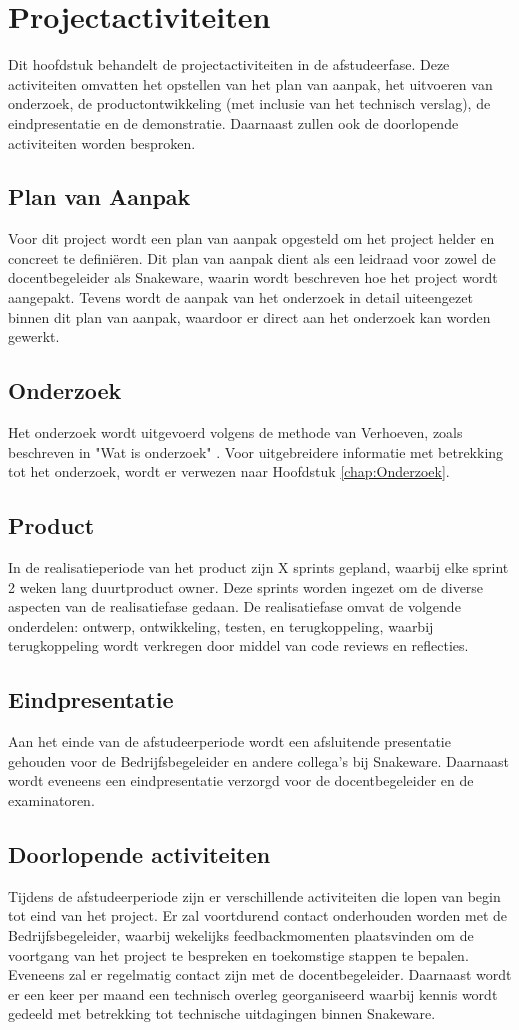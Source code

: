 \chapter{Projectactiviteiten}
Dit hoofdstuk behandelt de projectactiviteiten in de afstudeerfase.
Deze activiteiten omvatten het opstellen van het plan van aanpak, het uitvoeren van onderzoek, de productontwikkeling (met inclusie van het technisch verslag), de eindpresentatie en de demonstratie.
Daarnaast zullen ook de doorlopende activiteiten worden besproken.
\section{Plan van Aanpak}
Voor dit project wordt een plan van aanpak opgesteld om het project helder en concreet te definiëren.
Dit plan van aanpak dient als een leidraad voor zowel de docentbegeleider als Snakeware, waarin wordt beschreven hoe het project wordt aangepakt.
Tevens wordt de aanpak van het onderzoek in detail uiteengezet binnen dit plan van aanpak, waardoor er direct aan het onderzoek kan worden gewerkt.
\section{Onderzoek}
Het onderzoek wordt uitgevoerd volgens de methode van Verhoeven, zoals beschreven in "Wat is onderzoek" \Parencite{Verhoeven}.
Voor uitgebreidere informatie met betrekking tot het onderzoek, wordt er verwezen naar Hoofdstuk \ref{chap:Onderzoek}.
\section{Product}
In de realisatieperiode van het product zijn X sprints gepland, waarbij elke sprint 2 weken lang duurtproduct owner.
Deze sprints worden ingezet om de diverse aspecten van de realisatiefase gedaan.
De realisatiefase omvat de volgende onderdelen: ontwerp, ontwikkeling, testen, en terugkoppeling, waarbij terugkoppeling wordt verkregen door middel van code reviews en reflecties.
\section{Eindpresentatie}
Aan het einde van de afstudeerperiode wordt een afsluitende presentatie gehouden voor de Bedrijfsbegeleider en andere collega's bij Snakeware.
Daarnaast wordt eveneens een eindpresentatie verzorgd voor de docentbegeleider en de examinatoren.
\section{Doorlopende activiteiten}
Tijdens de afstudeerperiode zijn er verschillende activiteiten die lopen van begin tot eind van het project.
Er zal voortdurend contact onderhouden worden met de Bedrijfsbegeleider, waarbij wekelijks feedbackmomenten plaatsvinden om de voortgang van het project te bespreken en toekomstige stappen te bepalen.
Eveneens zal er regelmatig contact zijn met de docentbegeleider.
Daarnaast wordt er een keer per maand een technisch overleg georganiseerd waarbij kennis wordt gedeeld met betrekking tot technische uitdagingen binnen Snakeware.
